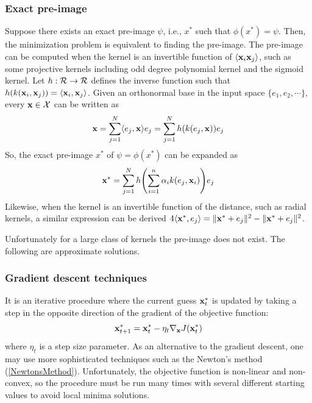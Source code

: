 \subsubsection{Exact pre-image}
Suppose there exists an exact pre-image $\psi$, i.e., $x^*$ such that $\phi(x^*) = \psi$. Then, the minimization problem is equivalent to finding the pre-image. The pre-image can be computed when the kernel is an invertible function of $\langle \mathbf{x}_i \mathbf{x}_j \rangle$, such as some projective kernels including odd degree polynomial kernel and the sigmoid kernel. Let $h: \CMcal{R}\rightarrow \CMcal{R}$ defines the inverse function such that $h\br{k(\x_i, \x_j)} = \langle\x_i, \x_j \rangle$. Given an orthonormal base in the input space $\{e_1, e_2, \cdots\}$, every $\x \in \CMcal{X}$ can be written as 
\begin{equation}
\x = \sum_{j=1}^N\langle e_j , \x\rangle e_j = \sum_{j=1}^N h\br{k(e_j, \x)} e_j
\end{equation}
So, the exact pre-image $x^*$ of $\psi = \phi(x^*)$ can be expanded as 
\begin{equation}
\x^* =\sum_{j=1}^N h\br{\sum_{i=1}^n\alpha_i k(e_j, \x_i)} e_j
\end{equation}
Likewise, when the kernel is an invertible function of the distance, such as radial kernels, a similar expression can be derived $4 \langle \mathbf{x}^*, e_j \rangle = \| \mathbf{x}^* + e_j \|^2 -\| \mathbf{x}^* + e_j \|^2 $.

Unfortunately for a large class of kernels the pre-image does not exist. The following are approximate solutions.

\subsubsection{Gradient descent techniques}
It is an iterative procedure where the current guess $\mathbf{x}^*_t$ is updated by taking a step in the opposite direction of the gradient of the objective function:
\begin{equation}
\mathbf{x}^*_{t+1} = \mathbf{x}^*_t - \eta_t \nabla_{\mathbf{x}} J(\mathbf{x}_t^*)
\end{equation}
where $\eta_t$ is a step size parameter. As an alternative to the gradient descent, one may use more sophisticated techniques such as the Newton's method (\autoref{NewtonsMethod}). Unfortunately, the objective function is non-linear and non-convex, so the procedure must be run many times with several different starting values to avoid local minima solutions.

